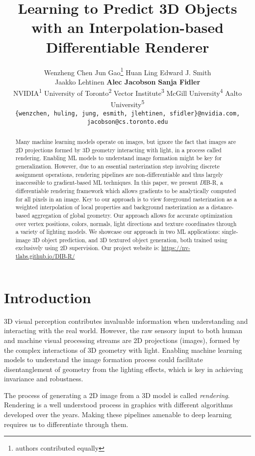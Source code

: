 \documentclass{article}
\title{Learning to Predict 3D Objects with an Interpolation-based Differentiable Renderer}
\author{Wenzheng Chen  \And Jun Gao\thanks{authors contributed equally}  \And Huan Ling  \And Edward J. Smith \\
\And Jaakko Lehtinen \quad \textbf{Alec Jacobson} \quad \textbf{Sanja Fidler} \vspace{6pt}\\
\small{NVIDIA\textsuperscript{1} \quad University of Toronto\textsuperscript{2} \quad Vector Institute\textsuperscript{3} \quad McGill University\textsuperscript{4} \quad Aalto University\textsuperscript{5}} \vspace{3pt}\\
\texttt{\scriptsize \{wenzchen, huling, jung, esmith, jlehtinen, sfidler\}@nvidia.com,
jacobson@cs.toronto.edu}
}
\newcommand{\model}{DIB-R}
\begin{document}
\maketitle
\begin{abstract}
Many machine learning models operate on images, but ignore the fact that images are 2D projections formed by 3D geometry interacting with light, in a process called rendering. Enabling ML models to understand image formation might be key for generalization. 
However, due to an essential rasterization step involving discrete assignment operations, rendering pipelines are non-differentiable and thus largely inaccessible to gradient-based ML techniques. In this paper, we present {\emph \model}, a differentiable rendering framework which allows gradients to be analytically computed for all pixels in an image. Key to our approach is to view foreground rasterization as a weighted interpolation of local properties and background rasterization as a distance-based aggregation of global geometry. Our approach allows for accurate optimization over vertex positions, colors, normals, light directions and texture coordinates through a variety of lighting models. We showcase our approach in two ML applications: single-image 3D object prediction, and 3D textured object generation, both trained using exclusively using 2D supervision. Our project website is: \href{https://nv-tlabs.github.io/DIB-R/}{https://nv-tlabs.github.io/DIB-R/}

\end{abstract}

\vspace{-17pt}
\section{Introduction}
\vspace{-10pt}
3D visual perception contributes invaluable information when understanding and interacting with the real world. However, the raw sensory input to both human and machine visual processing streams are 2D projections (images), formed by the complex interactions of 3D geometry with light. Enabling machine learning models to understand the image formation process could facilitate disentanglement of geometry from the lighting effects, which is key in achieving invariance and robustness.
  



The process of generating a 2D image from a 3D model is called \emph{rendering}. Rendering is a well understood process in graphics with different algorithms developed over the years. Making these pipelines amenable to deep learning requires us to differentiate through them.
\end{document}
